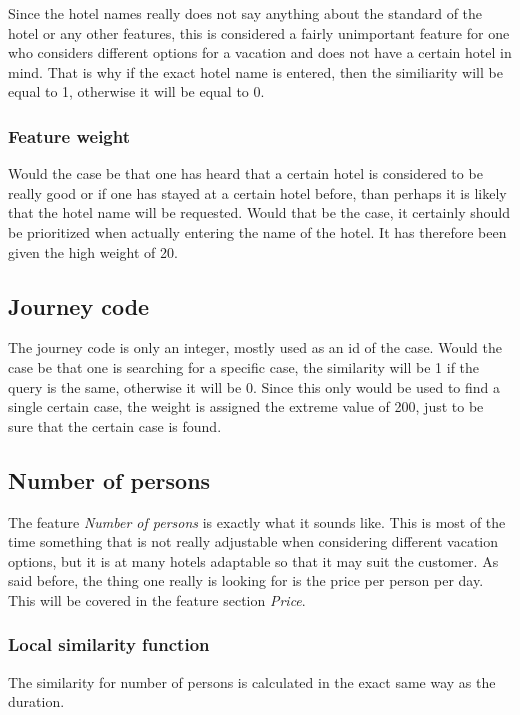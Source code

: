 \documentclass[12pt]{article}
\begin{document}
Since the hotel names really does not say anything about the standard of the hotel or any other features, this is considered a fairly unimportant feature for one who considers different options for a vacation and does not have a certain hotel in mind. That is why if the exact hotel name is entered, then the similiarity will be equal to 1, otherwise it will be equal to 0. 

\subsubsection{Feature weight}

Would the case be that one has heard that a certain hotel is considered to be really good or if one has stayed at a certain hotel before, than perhaps it is likely that the hotel name will be requested. Would that be the case, it certainly should be prioritized when actually entering the name of the hotel. It has therefore been given the high weight of 20. 

\subsection{Journey code}

The journey code is only an integer, mostly used as an id of the case. Would the case be that one is searching for a specific case, the similarity will be 1 if the query is the same, otherwise it will be 0. Since this only would be used to find a single certain case, the weight is assigned the extreme value of 200, just to be sure that the certain case is found. 

\subsection{Number of persons}

The feature \textit{Number of persons} is exactly what it sounds like. This is most of the time something that is not really adjustable when considering different vacation options, but it is at many hotels adaptable so that it may suit the customer. As said before, the thing one really is looking for is the price per person per day. This will be covered in the feature section \textit{Price}. 

\subsubsection{Local similarity function}

The similarity for number of persons is calculated in the exact same way as the duration. 
\end{document}
